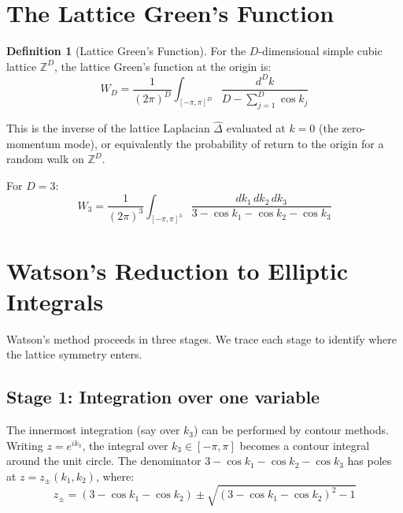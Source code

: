\documentclass[12pt]{article}
\theoremstyle{definition}
\newtheorem{definition}[theorem]{Definition}
\theoremstyle{remark}
\begin{document}
\section{The Lattice Green's Function}
\label{sec:green}

\begin{definition}[Lattice Green's Function]
For the $D$-dimensional simple cubic lattice $\mathbb{Z}^D$, the lattice Green's function at the origin is:
\begin{equation}
    W_D = \frac{1}{(2\pi)^D}\int_{[-\pi,\pi]^D} \frac{d^Dk}{D - \sum_{j=1}^D \cos k_j}
    \label{eq:WD}
\end{equation}
\end{definition}

This is the inverse of the lattice Laplacian $\hat{\Delta}$ evaluated at $k = 0$ (the zero-momentum mode), or equivalently the probability of return to the origin for a random walk on $\mathbb{Z}^D$.

For $D = 3$:
\begin{equation}
    W_3 = \frac{1}{(2\pi)^3}\int_{[-\pi,\pi]^3} \frac{dk_1\,dk_2\,dk_3}{3 - \cos k_1 - \cos k_2 - \cos k_3}
    \label{eq:W3}
\end{equation}

\section{Watson's Reduction to Elliptic Integrals}
\label{sec:watson}

Watson's method \cite{watson1939} proceeds in three stages. We trace each stage to identify where the lattice symmetry enters.

\subsection{Stage 1: Integration over one variable}

The innermost integration (say over $k_3$) can be performed by contour methods. Writing $z = e^{ik_3}$, the integral over $k_3 \in [-\pi, \pi]$ becomes a contour integral around the unit circle. The denominator $3 - \cos k_1 - \cos k_2 - \cos k_3$ has poles at $z = z_\pm(k_1, k_2)$, where:
\begin{equation}
    z_\pm = (3 - \cos k_1 - \cos k_2) \pm \sqrt{(3 - \cos k_1 - \cos k_2)^2 - 1}
\end{equation}
\end{document}
